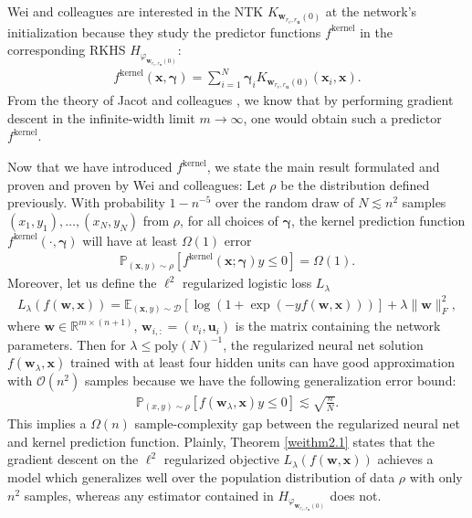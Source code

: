 \documentclass{article}
\newenvironment{manualtheorem}[1]{%
  \renewcommand\themanualtheoreminner{#1}%
  \manualtheoreminner
}{\endmanualtheoreminner}
\begin{document}
Wei and colleagues are interested in the NTK $K_{\boldsymbol{w}_{r_v, r_{\boldsymbol{u}}}(0)}$ at the network's initialization because they study the predictor functions $f^{\text{kernel}}$ in the corresponding RKHS $H_{\varphi_{\boldsymbol{w}_{r_v, r_{\boldsymbol{u}}}(0)}}$: 
\begin{align*}
f^{\text{kernel}}(\boldsymbol{x}, \boldsymbol{\gamma}) = \sum_{i=1}^N \boldsymbol{\gamma}_i K_{\boldsymbol{w}_{r_v, r_{\boldsymbol{u}}}(0)}(\boldsymbol{x}_i, \boldsymbol{x}).
\end{align*}
From the theory of Jacot and colleagues \cite{jacot2018neural}, we know that by performing gradient descent in the infinite-width limit $m \rightarrow \infty$, one would obtain such a predictor $f^{\text{kernel}}$.

Now that we have introduced $f^{\text{kernel}}$, we state the main result formulated and proven and proven by Wei and colleagues: 
\begin{manualtheorem}{2.1}[from \cite{wei2019regularization}]\label{weithm2.1}
Let $\rho$ be the distribution defined previously. With probability $1 - n^{-5}$ over the random draw of $N \lesssim n^2$ samples $(x_1, y_1), \ldots, (x_N, y_N)$ from $\rho$, for all choices of $\boldsymbol{\gamma}$, the kernel prediction function $f^{\text{kernel}}(\cdot, \boldsymbol{\gamma})$ will have at least $\Omega(1)$ error
\begin{align*}
    \mathbb{P}_{(\boldsymbol{x}, y) \sim \rho}[f^{\text{kernel}}(\boldsymbol{x}; \boldsymbol{\gamma})y \leq 0] = \Omega(1).
\end{align*}
Moreover, let us define the $\ell^2$ regularized logistic loss $L_{\lambda}$
\begin{align*}
    L_{\lambda}(f(\boldsymbol{w}, \boldsymbol{x})) = \mathbb{E}_{(\boldsymbol{x}, y) \sim \mathcal{D}} \left[\log \left( 1 + \exp(-y f(\boldsymbol{w}, \boldsymbol{x})) \right) \right] + \lambda \|\boldsymbol{w} \|_F^2,
\end{align*}
where $\boldsymbol{w} \in \mathbb{R}^{m \times (n+1)}$, $\boldsymbol{w}_{i,:} = (v_i, \boldsymbol{u}_i)$ is the matrix containing the network parameters. Then for $\lambda \leq \text{poly}(N)^{-1}$, the regularized neural net solution $f(\boldsymbol{w}_{\lambda}, \boldsymbol{x})$ trained with at least four hidden units can have good approximation with $\mathcal{O}(n^2)$ samples because we have the following generalization error bound:
\begin{align*}
   \mathbb{P}_{(x,y) \sim \rho}[f(\boldsymbol{w}_{\lambda}, \boldsymbol{x})y \leq 0] \lesssim \sqrt{\frac{n}{N}}.
\end{align*}
This implies a $\Omega(n)$ sample-complexity gap between the regularized neural net and kernel prediction function.
\end{manualtheorem}
Plainly, Theorem \ref{weithm2.1} states that the gradient descent on the $\ell^2$ regularized objective $L_{\lambda}(f(\boldsymbol{w}, \boldsymbol{x}))$ achieves a model which generalizes well over the population distribution of data $\rho$ with only $n^2$ samples, whereas any estimator contained in $H_{\varphi_{\boldsymbol{w}_{r_v, r_{\boldsymbol{u}}}(0)}}$ does not.
\end{document}
